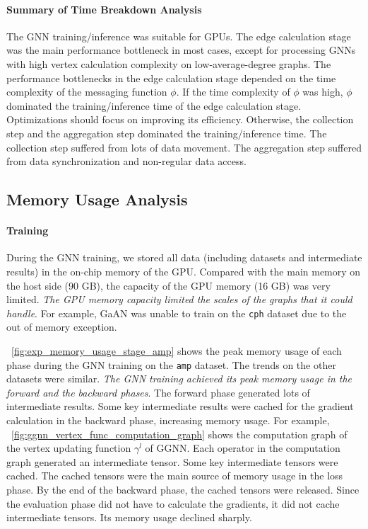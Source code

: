 \paragraph{Summary of Time Breakdown Analysis}

The GNN training/inference was suitable for GPUs.
%
{The edge calculation stage was the main performance bottleneck in most cases}, except for processing GNNs with high vertex calculation complexity on low-average-degree graphs.
%
The performance bottlenecks in the edge calculation stage depended on the time complexity of the messaging function $\phi$.
%
If the time complexity of $\phi$ was {high}, {$\phi$} dominated the training/inference time of the edge calculation stage.
%
Optimizations should focus on improving its efficiency.
%
Otherwise, the {collection step} and the {aggregation step} dominated the training/inference time.
%
The collection step suffered from lots of data movement.
%
The aggregation step suffered from data synchronization and non-regular data access.

\subsection{Memory Usage Analysis}
\label{sec:memory_usage_analysis}

\paragraph{Training}

During the GNN training, we stored all data (including datasets and intermediate results) in the on-chip memory of the GPU.
%
Compared with the main memory on the host side (90 GB), the capacity of the GPU memory (16 GB) was very limited.
%
\emph{The GPU memory capacity limited the scales of the graphs that it could handle}.
%
For example, GaAN was unable to train on the \texttt{cph} dataset due to the out of memory exception.

\figurename~\ref{fig:exp_memory_usage_stage_amp} shows the peak memory usage of each phase during the GNN training on the \texttt{amp} dataset.
%
The trends on the other datasets were similar.
%
\emph{The GNN training achieved its peak memory usage in the forward and the backward phases}.
%
The forward phase generated lots of intermediate results.
%
Some key intermediate results were cached for the gradient calculation in the backward phase, increasing memory usage.
%
For example, \figurename~\ref{fig:ggnn_vertex_func_computation_graph} shows the computation graph of the vertex updating function $\gamma^l$ of GGNN.
%
Each operator in the computation graph generated an intermediate tensor.
%
Some key intermediate tensors were cached.
%
The cached tensors were the main source of memory usage in the loss phase.
%
By the end of the backward phase, the cached tensors were released.
%
Since the evaluation phase did not have to calculate the gradients, it did not cache intermediate tensors.
%
Its memory usage declined sharply.

